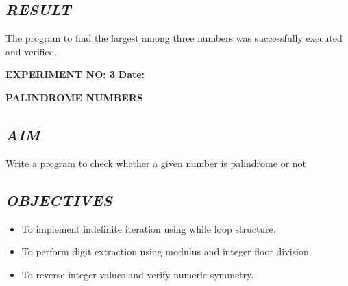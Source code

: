 \documentclass[11pt,a4paper]{article}
\begin{document}
\subsection*{\textit{RESULT}}
The program to find the largest among three numbers was successfully executed and verified.

\newpage

\noindent
\textbf{\large EXPERIMENT NO: 3} \hfill \textbf{\large Date: \underline{\hspace{3cm}}}

\vspace{0.2cm}
\begin{center}
{\Huge \textbf{\textcolor{navyblue}{PALINDROME NUMBERS}}}
\end{center}
\vspace{0.3cm}

\subsection*{\textit{AIM}}
Write a program to check whether a given number is palindrome or not

\subsection*{\textit{OBJECTIVES}}
\begin{itemize}
  \item To implement indefinite iteration using while loop structure.
  \item To perform digit extraction using modulus and integer floor division.
  \item To reverse integer values and verify numeric symmetry.
\end{itemize}
\end{document}
